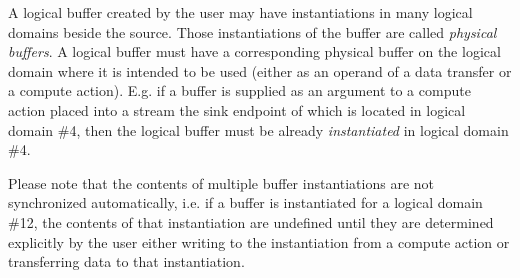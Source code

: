 \documentclass[a4,oneside]{book}
\begin{document}
A logical buffer created by the user may have instantiations in many logical domains beside the source.
Those instantiations of the buffer are called \emph{physical buffers}.
A logical buffer must have a corresponding physical buffer on the logical domain where it is intended to be used (either as an operand of a data transfer or a compute action).
E.g. if a buffer is supplied as an argument to a compute action placed into a stream the sink endpoint of which is located in logical domain \#4, then the logical buffer must be already \emph{instantiated} in logical domain \#4.

Please note that the contents of multiple buffer instantiations are not synchronized automatically, i.e. if a buffer is instantiated for a logical domain \#12, the contents of that instantiation are undefined until they are determined explicitly by the user either writing to the instantiation from a compute action or transferring data to that instantiation.
\end{document}
